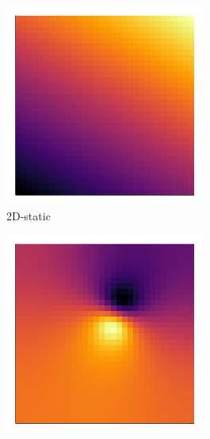 \documentclass[review]{elsarticle}
\begin{document}
\begin{figure}
    \centering
    \begin{subfigure}[b]{0.3\textwidth}
        \centering
        \includegraphics[width=\textwidth]{figures/2D-static.png}
        \caption{2D-static}
        \label{fig:2D-static}
    \end{subfigure}
    \begin{subfigure}[b]{0.3\textwidth}
        \centering
        \includegraphics[width=\textwidth]{figures/2D-dipole.png}

\end{subfigure}
\end{figure}
\end{document}
